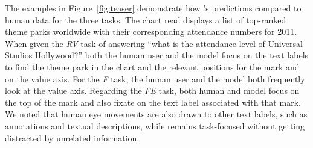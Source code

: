 The examples in Figure~\ref{fig:teaser} demonstrate how \name's predictions compared to human data for the three tasks. The chart read displays a list of top-ranked theme parks worldwide with their corresponding attendance numbers for 2011. 
When given the \textit{RV} task of answering ``what is the attendance level of Universal Studios Hollywood?'' both the human user and the model focus on the text labels to find the theme park in the chart and the relevant positions for the mark and on the value axis.
For the \textit{F} task, the human user and the model both frequently look at the value axis.
Regarding the \textit{FE} task, both human and model focus on the top of the mark and also fixate on the text label associated with that mark. 
We noted that human eye movements are also drawn to other text labels, such as annotations and textual descriptions, while \name remains task-focused without getting distracted by unrelated information.